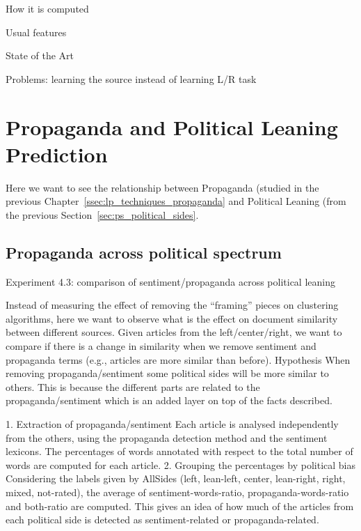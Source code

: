 How it is computed

Usual features

State of the Art

Problems: learning the source instead of learning L/R task

\section{Propaganda and Political Leaning Prediction}
\label{sec:ps_prop_and_leaning}

Here we want to see the relationship between Propaganda (studied in the previous Chapter~\ref{ssec:lp_techniques_propaganda} and Political Leaning (from the previous Section~\ref{sec:ps_political_sides}.

\subsection{Propaganda across political spectrum}
Experiment 4.3: comparison of sentiment/propaganda across political leaning

Instead of measuring the effect of removing the “framing” pieces on clustering algorithms, here we want to observe what is the effect on document similarity between different sources.
Given articles from the left/center/right, we want to compare if there is a change in similarity when we remove sentiment and propaganda terms (e.g., articles are more similar than before).
Hypothesis
When removing propaganda/sentiment some political sides will be more similar to others. This is because the different parts are related to the propaganda/sentiment which is an added layer on top of the facts described.

1. Extraction of propaganda/sentiment
Each article is analysed independently from the others, using the propaganda detection method and the sentiment lexicons.
The percentages of words annotated with respect to the total number of words are computed for each article.
2. Grouping the percentages by political bias
Considering the labels given by AllSides (left, lean-left, center, lean-right, right, mixed, not-rated), the average of sentiment-words-ratio, propaganda-words-ratio and both-ratio are computed. This gives an idea of how much of the articles from each political side is detected as sentiment-related or propaganda-related.

